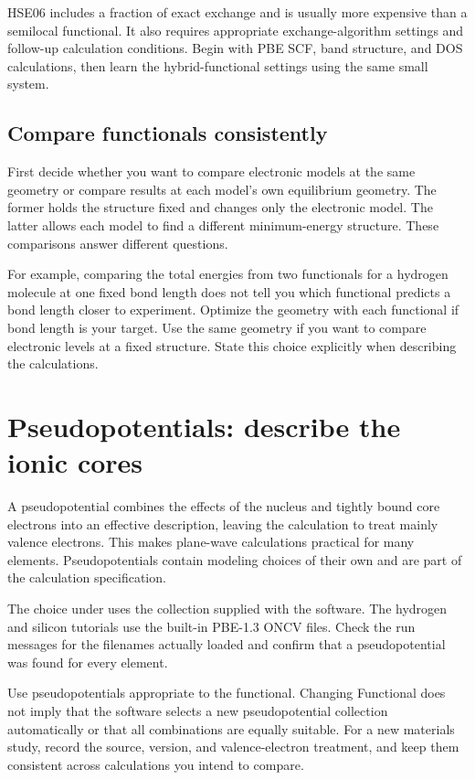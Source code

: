 HSE06 includes a fraction of exact exchange and is usually more expensive than a semilocal functional. It also requires appropriate exchange-algorithm settings and follow-up calculation conditions. Begin with PBE SCF, band structure, and DOS calculations, then learn the hybrid-functional settings using the same small system.

\subsection{Compare functionals consistently}

First decide whether you want to compare electronic models at the same geometry or compare results at each model's own equilibrium geometry. The former holds the structure fixed and changes only the electronic model. The latter allows each model to find a different minimum-energy structure. These comparisons answer different questions.

For example, comparing the total energies from two functionals for a hydrogen molecule at one fixed bond length does not tell you which functional predicts a bond length closer to experiment. Optimize the geometry with each functional if bond length is your target. Use the same geometry if you want to compare electronic levels at a fixed structure. State this choice explicitly when describing the calculations.

\section{Pseudopotentials: describe the ionic cores}

A pseudopotential combines the effects of the nucleus and tightly bound core electrons into an effective description, leaving the calculation to treat mainly valence electrons. This makes plane-wave calculations practical for many elements. Pseudopotentials contain modeling choices of their own and are part of the calculation specification.

The  choice under  uses the collection supplied with the software. The hydrogen and silicon tutorials use the built-in PBE-1.3 ONCV files. Check the run messages for the filenames actually loaded and confirm that a pseudopotential was found for every element.

Use pseudopotentials appropriate to the functional. Changing Functional does not imply that the software selects a new pseudopotential collection automatically or that all combinations are equally suitable. For a new materials study, record the source, version, and valence-electron treatment, and keep them consistent across calculations you intend to compare.

